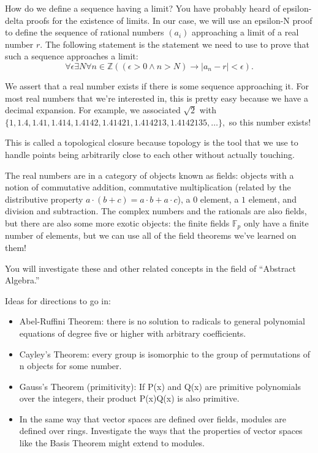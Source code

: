 \documentclass{article}
\begin{document}
    How do we define a sequence having a limit?
    You have probably heard of epsilon-delta proofs for the existence of limits.
    In our case, we will use an epsilon-N proof to define the sequence of rational numbers $(a_i)$ approaching a limit of a real number $r.$
    The following statement is the statement we need to use to prove that such a sequence approaches a limit:
    $$\forall\epsilon\exists N\forall n\in\mathbb{Z} ((\epsilon>0\land n>N) \to |a_n-r|<\epsilon).$$

    We assert that a real number exists if there is some sequence approaching it.
    For most real numbers that we're interested in, this is pretty easy because we have a decimal expansion.
    For example, we associated $\sqrt 2$ with $\{1,1.4,1.41,1.414,1.4142,1.41421,1.414213,1.4142135,\ldots\},$ so this number exists!

    This is called a topological closure because topology is the tool that we use to handle points being arbitrarily close to each other without actually touching.
    

    The real numbers are in a category of objects known as fields: objects with a notion of commutative addition, commutative multiplication (related by the distributive property $a\cdot (b+c)=a\cdot b + a\cdot c$), a $0$ element, a $1$ element, and division and subtraction.
    The complex numbers and the rationals are also fields, but there are also some more exotic objects: the finite fields $\mathbb{F}_p$ only have a finite number of elements, but we can use all of the field theorems we've learned on them!

    You will investigate these and other related concepts in the field of ``Abstract Algebra.''

    Ideas for directions to go in:
    \begin{itemize}
        \item Abel-Ruffini Theorem: there is no solution to radicals to general polynomial equations of degree five or higher with arbitrary coefficients. 
        \item Cayley's Theorem: every group is isomorphic to the group of permutations of n objects for some number.
        \item Gauss's Theorem (primitivity): If P(x) and Q(x) are primitive polynomials over the integers, their product P(x)Q(x) is also primitive.
        \item In the same way that vector spaces are defined over fields, modules are defined over rings. Investigate the ways that the properties of vector spaces like the Basis Theorem might extend to modules.
    \end{itemize}
\end{document}

